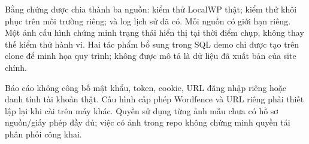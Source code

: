 \documentclass[11pt,a4paper,oneside]{report}
\begin{document}
Bằng chứng được chia thành ba nguồn: kiểm thử LocalWP thật; kiểm thử khôi phục trên môi trường riêng; và log lịch sử đã có. Mỗi nguồn có giới hạn riêng. Một ảnh cấu hình chứng minh trạng thái hiển thị tại thời điểm chụp, không thay thế kiểm thử hành vi. Hai tác phẩm bổ sung trong SQL demo chỉ được tạo trên clone để minh họa quy trình; không được mô tả là dữ liệu đã xuất bản của site chính.

Báo cáo không công bố mật khẩu, token, cookie, URL đăng nhập riêng hoặc danh tính tài khoản thật. Cấu hình cấp phép Wordfence và URL riêng phải thiết lập lại khi cài trên máy khác. Quyền sử dụng từng ảnh mẫu chưa có hồ sơ nguồn/giấy phép đầy đủ; việc có ảnh trong repo không chứng minh quyền tái phân phối công khai.
\setcounter{tocdepth}{1}
\begingroup\small{}
\makeatletter
\def\@makeschapterhead#1{\vspace*{10pt}{\parindent\z@\raggedright\normalfont\huge\bfseries #1\par\nobreak\vskip18pt}}
\makeatother
\tableofcontents
\listoffigures
\begingroup\let\clearpage\relax\listoftables\endgroup
\endgroup
\clearpage{}






\end{document}
